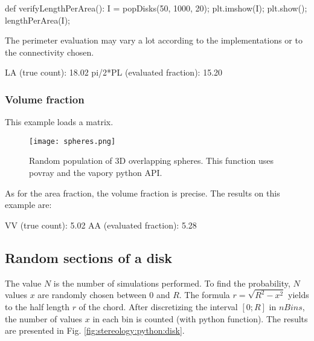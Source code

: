\begin{python}
def verifyLengthPerArea():
    I = popDisks(50, 1000, 20);
    plt.imshow(I);
    plt.show();
    lengthPerArea(I);
\end{python}

The perimeter evaluation may vary a lot according to the implementations or to the connectivity chosen.
\begin{sh}
LA (true count): 18.02%
pi/2*PL (evaluated fraction): 15.20%
\end{sh}

\subsubsection{Volume fraction}
This example loads a \matlabregistered{} matrix.


\begin{figure}[htbp]
 \centering\caption{Random population of 3D overlapping spheres. This function uses povray and the vapory python API.}%
 \texttt{[image: spheres.png]}%
 \label{fig:stereology:python:overlapping_spheres}%
\end{figure}

As for the area fraction, the volume fraction is precise. The results on this example are:

\begin{sh}
VV (true count): 5.02%
AA (evaluated fraction): 5.28%
\end{sh}


\subsection{Random sections of a disk}
The value $N$ is the number of simulations performed. 
To find the probability, $N$ values $x$ are randomly chosen between $0$ and $R$. The formula $r=\sqrt{R^2-x^2}$ yields to the half length $r$ of the chord. After discretizing the interval $[0;R]$ in $nBins$, the number of values $x$ in each bin is counted (with python  function). The results are presented in Fig. \ref{fig:stereology:python:disk}.

